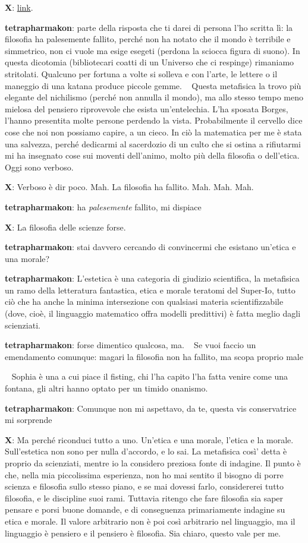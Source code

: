 \textbf{X}:
\href{http://www.lescienze.it/news/2015/05/16/news/discussione_fisici_filosofi_filosofia_morta_viva-2611425/}{link}.

\textbf{tetrapharmakon}: parte della risposta che ti darei di persona
l'ho scritta lì: la filosofia ha palesemente fallito, perché non ha
notato che il mondo è terribile e simmetrico, non ci vuole ma esige
esegeti (perdona la sciocca figura di suono). In questa dicotomia
(bibliotecari coatti di un Universo che ci respinge) rimaniamo
stritolati. Qualcuno per fortuna a volte si solleva e con l'arte, le
lettere o il maneggio di una katana produce piccole gemme. ~ Questa
metafisica la trovo più elegante del nichilismo (perché non annulla il
mondo), ma allo stesso tempo meno mielosa del pensiero riprovevole che
esista un'entelechia. L'ha sposata Borges, l'hanno presentita molte
persone perdendo la vista. Probabilmente il cervello dice cose che noi
non possiamo capire, a un cieco. In ciò la matematica per me è stata una
salvezza, perché dedicarmi al sacerdozio di un culto che si ostina a
rifiutarmi mi ha insegnato cose sui moventi dell'animo, molto più della
filosofia o dell'etica. Oggi sono verboso.

\textbf{X}: Verboso è dir poco. Mah. La filosofia ha fallito. Mah. Mah.
Mah.

\textbf{tetrapharmakon}: ha \emph{palesemente} fallito, mi dispiace

\textbf{X}: La filosofia delle scienze forse.

\textbf{tetrapharmakon}: stai davvero cercando di convincermi che
esistano un'etica e una morale?

\textbf{tetrapharmakon}: L'estetica è una categoria di giudizio
scientifica, la metafisica un ramo della letteratura fantastica, etica e
morale teratomi del Super-Io, tutto ciò che ha anche la minima
intersezione con qualsiasi materia scientifizzabile (dove, cioè, il
linguaggio matematico offra modelli predittivi) è fatta meglio dagli
scienziati.

\textbf{tetrapharmakon}: forse dimentico qualcosa, ma. ~ Se vuoi faccio
un emendamento comunque: magari la filosofia non ha fallito, ma scopa
proprio male

~ Sophia è una a cui piace il fisting, chi l'ha capito l'ha fatta venire
come una fontana, gli altri hanno optato per un timido onanismo.

\textbf{tetrapharmakon}: Comunque non mi aspettavo, da te, questa vis
conservatrice mi sorprende

\textbf{X}: Ma perché riconduci tutto a uno. Un'etica e una morale,
l'etica e la morale. Sull'estetica non sono per nulla d'accordo, e lo
sai. La metafisica così' detta è proprio da scienziati, mentre io la
considero preziosa fonte di indagine. Il punto è che, nella mia
piccolissima esperienza, non ho mai sentito il bisogno di porre scienza
e filosofia sullo stesso piano, e se mai dovessi farlo, considererei
tutto filosofia, e le discipline suoi rami. Tuttavia ritengo che fare
filosofia sia saper pensare e porsi buone domande, e di conseguenza
primariamente indagine su etica e morale. Il valore arbitrario non è poi
così arbitrario nel linguaggio, ma il linguaggio è pensiero e il
pensiero è filosofia. Sia chiaro, questo vale per me.

